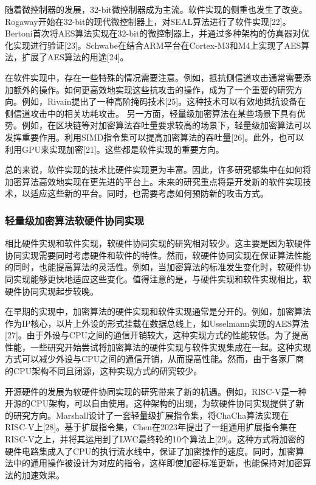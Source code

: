 \documentclass{ctexart}
\begin{document}
随着微控制器的发展，32-bit微控制器成为主流。软件实现的侧重也发生了改变。Rogaway开始在32-bit的现代微控制器上，对SEAL算法进行了软件实现[22]。Bertoni首次将AES算法实现在32-bit的微控制器上，并通过多种架构的仿真器对优化实现进行验证[23]。Schwabe在结合ARM平台在Cortex-M3和M4上实现了AES算法，扩展了AES算法的用途[24]。

在软件实现中，存在一些特殊的情况需要注意。例如，抵抗侧信道攻击通常需要添加额外的操作。如何更高效地实现这些抗攻击的操作，成为了一个重要的研究方向。例如，Rivain提出了一种高阶掩码技术[25]。这种技术可以有效地抵抗设备在侧信道攻击中的相关功耗攻击。
另一方面，轻量级加密算法在某些场景下具有优势。例如，在区块链等对加密算法吞吐量要求较高的场景下，轻量级加密算法可以发挥重要作用。利用SIMD指令集可以提高加密算法的吞吐量[26]。此外，也可以利用GPU来实现加密[21]。这些都是软件实现的重要方向。

总的来说，软件实现的技术比硬件实现更为丰富。因此，许多研究都集中在如何将加密算法高效地实现在更先进的平台上。未来的研究重点将是开发新的软件实现技术，以适应这些新的平台。同时，也需要考虑如何预防新的攻击方式。

\subsubsection{轻量级加密算法软硬件协同实现}
相比硬件实现和软件实现，软硬件协同实现的研究相对较少。这主要是因为软硬件协同实现需要同时考虑硬件和软件的特性。然而，软硬件协同实现在保证算法性能的同时，也能提高算法的灵活性。例如，当加密算法的标准发生变化时，软硬件协同实现能够更快地适应这些变化。值得注意的是，与硬件实现和软件实现相比，软硬件协同实现起步较晚。

在早期的实现中，加密算法的硬件实现和软件实现通常是分开的。例如，加密算法作为IP核心，以片上外设的形式挂载在数据总线上，如Usselmann实现的AES算法[27]。由于外设与CPU之间的通信开销较大，这种实现方式的性能较低。为了提高性能，一些研究开始尝试将加密算法的硬件实现与软件实现集成在一起。这种实现方式可以减少外设与CPU之间的通信开销，从而提高性能。然而，由于各家厂商的CPU架构不同且闭源，这种实现方式的研究较少。

开源硬件的发展为软硬件协同实现的研究带来了新的机遇。例如，RISC-V是一种开源的CPU架构，可以自由使用。这种架构的出现，为软硬件协同实现提供了新的研究方向。Marshall设计了一套轻量级扩展指令集，将ChaCha算法实现在RISC-V上[28]。基于扩展指令集，Chen在2023年提出了一组通用扩展指令集在RISC-V之上，并将其运用到了LWC最终轮的10个算法上[29]。这种方式将加密的硬件电路集成入了CPU的执行流水线中，保证了加密操作的速度。同时，加密算法中的通用操作被设计为对应的指令，这样即使加密标准更新，也能保持对加密算法的加速效果。
\end{document}
